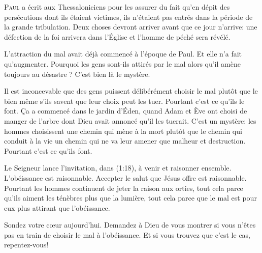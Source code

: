 \jrnlmonth




\lettrine{P}{aul} a écrit aux Thessaloniciens pour les assurer du fait
 qu'en dépit des persécutions dont ils étaient victimes,
 ils n'étaient pas entrés dans la période de la grande tribulation.
 Deux choses devront arriver avant que ce jour n'arrive:
 une défection de la foi arrivera dans l'Église 
 et l'homme de péché sera révélé.

L'attraction du mal avait déjà commencé à l'époque de Paul.
 Et elle n'a fait qu'augmenter. Pourquoi 
 les gens sont-ils attirés
 par le mal alors qu'il amène toujours au désastre ?
 C'est bien là le mystère.


Il est inconcevable que des gens puissent délibérément choisir le mal
 plutôt que le bien \ocadr même s'ils savent que leur choix peut les tuer.
 Pourtant c'est ce qu'ils le font.
 Ça a commencé dans le jardin d'Éden, quand Adam et Ève ont choisi de manger
 de l'arbre dont Dieu avait annoncé qu'il les tuerait.
 C'est un mystère: les hommes choisissent une chemin qui mène à la mort
 plutôt que le chemin qui conduit à la vie
 \ocadr un chemin qui ne va leur amener que malheur et destruction.
 Pourtant c'est ce qu'ils font.

Le Seigneur lance l'invitation, dans (1:18),
 à \Og venir et raisonner ensemble. \Fg{} L'obéissance est raisonnable.
 Accepter le salut que Jésus offre est raisonnable.
 Pourtant les hommes continuent  de jeter la raison aux orties,
 tout cela parce qu'ils aiment les ténèbres plus que la lumière,
 tout cela parce que le mal est pour eux plus attirant que l'obéissance.

Sondez votre c\oe{}ur aujourd'hui. Demandez à Dieu de vous montrer
 si vous n'êtes pas en train de choisir le mal à l'obéissance.
 Et si vous trouvez que c'est le cas, repentez-vous!

\dvrule



